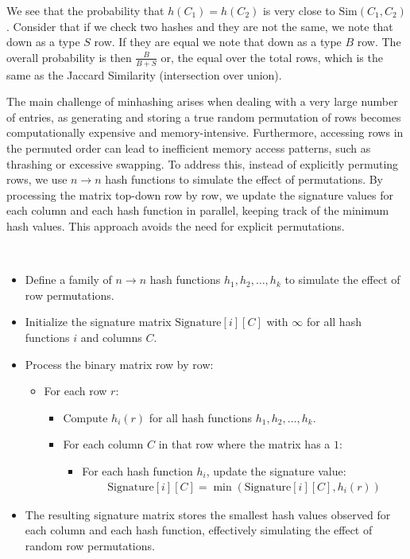 We see that the probability that $h(C_1) = h(C_2)$ is very close to
$\text{Sim}(C_1, C_2)$. Consider that if we check two hashes and they
are not the same, we note that down as a type $S$ row. If they are equal
we note that down as a type $B$ row. The overall probability is then
$\frac{B}{B + S}$ or, the equal over the total rows, which is the same
as the Jaccard Similarity (intersection over union).

The main challenge of minhashing arises when dealing with a very
large number of entries, as generating and storing a true random
permutation of rows becomes computationally expensive and
memory-intensive. Furthermore, accessing rows in the permuted order
can lead to inefficient memory access patterns, such as thrashing or
excessive swapping. To address this, instead of explicitly permuting
rows, we use $n \rightarrow n$ hash functions to simulate the effect
of permutations. By processing the matrix top-down row by row, we
update the signature values for each column and each hash function in
parallel, keeping track of the minimum hash values. This approach
avoids the need for explicit permutations.

\begin{definition}
  ~
  \begin{itemize}
    \item Define a family of $n \rightarrow n$ hash functions $h_1,
      h_2, \dots, h_k$ to simulate the effect of row permutations.
    \item Initialize the signature matrix $\text{Signature}[i][C]$
      with $\infty$ for all hash functions \(i\) and columns \(C\).
    \item Process the binary matrix row by row:
      \begin{itemize}
        \item For each row \(r\):
          \begin{itemize}
            \item Compute \(h_i(r)\) for all hash functions \(h_1,
              h_2, \dots, h_k\).
            \item For each column \(C\) in that row where the matrix
              has a \(1\):
              \begin{itemize}
                \item For each hash function \(h_i\), update the
                  signature value:
                  \begin{align*}
                    \text{Signature}[i][C] =
                    \min(\text{Signature}[i][C], h_i(r))
                  \end{align*}
              \end{itemize}
          \end{itemize}
      \end{itemize}
    \item The resulting signature matrix stores the smallest hash
      values observed for each column and each hash function,
      effectively simulating the effect of random row permutations.
  \end{itemize}
\end{definition}

